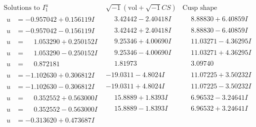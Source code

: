 \documentclass[1p]{elsarticle_modified}
\theoremstyle{definition}
\newcommand{\I}{\sqrt{-1}}
\begin{document}
$$\begin{array}{c|c|c}  
\text{Solutions to }I^u_{1}& \I (\text{vol} + \sqrt{-1}CS) & \text{Cusp shape}\\
 \hline 
\begin{aligned}
u &= -0.957042 + 0.156119 I\end{aligned}
 & \phantom{-}3.42442 - 2.40418 I & \phantom{-}8.88830 + 6.40859 I \\ \hline\begin{aligned}
u &= -0.957042 - 0.156119 I\end{aligned}
 & \phantom{-}3.42442 + 2.40418 I & \phantom{-}8.88830 - 6.40859 I \\ \hline\begin{aligned}
u &= \phantom{-}1.053290 + 0.250152 I\end{aligned}
 & \phantom{-}9.25346 + 4.00690 I & \phantom{-}11.03271 - 4.36295 I \\ \hline\begin{aligned}
u &= \phantom{-}1.053290 - 0.250152 I\end{aligned}
 & \phantom{-}9.25346 - 4.00690 I & \phantom{-}11.03271 + 4.36295 I \\ \hline\begin{aligned}
u &= \phantom{-}0.872181\phantom{ +0.000000I}\end{aligned}
 & \phantom{-}1.81973\phantom{ +0.000000I} & \phantom{-}3.09740\phantom{ +0.000000I} \\ \hline\begin{aligned}
u &= -1.102630 + 0.306812 I\end{aligned}
 & -19.0311 - 4.8024 I & \phantom{-}11.07225 + 3.50232 I \\ \hline\begin{aligned}
u &= -1.102630 - 0.306812 I\end{aligned}
 & -19.0311 + 4.8024 I & \phantom{-}11.07225 - 3.50232 I \\ \hline\begin{aligned}
u &= \phantom{-}0.352552 + 0.563000 I\end{aligned}
 & \phantom{-}15.8889 + 1.8393 I & \phantom{-}6.96532 - 3.24641 I \\ \hline\begin{aligned}
u &= \phantom{-}0.352552 - 0.563000 I\end{aligned}
 & \phantom{-}15.8889 - 1.8393 I & \phantom{-}6.96532 + 3.24641 I \\ \hline\begin{aligned}
u &= -0.313620 + 0.473687 I\end{aligned}

\end{array}$$
\end{document}

